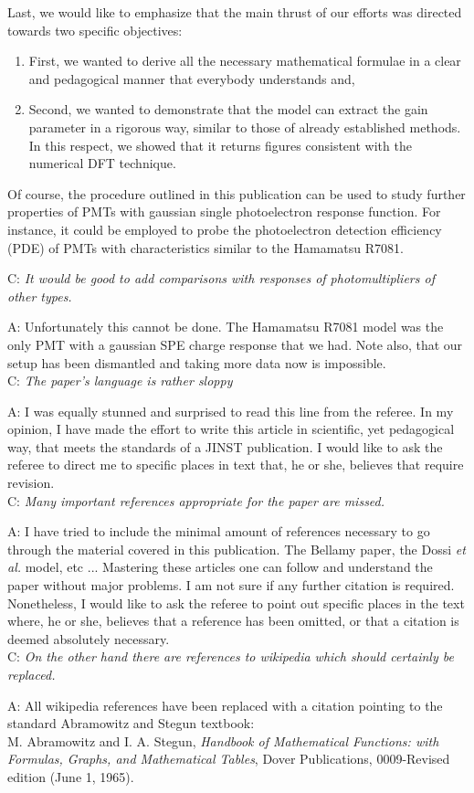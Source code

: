\documentclass[a4paper,11pt]{article}
\begin{document}
Last, we would like to emphasize that the main thrust of our efforts was directed towards two specific objectives:
\begin{enumerate}
\item First, we wanted to derive all the necessary mathematical formulae in a clear and pedagogical manner that everybody understands and,
\item Second, we wanted to demonstrate that the model can extract the gain parameter in a rigorous way, similar to those of already established methods. 
In this respect, we showed that it returns figures consistent with the numerical DFT technique.  
\end{enumerate}
Of course, the procedure outlined in this publication can be used to study further properties of PMTs with gaussian single photoelectron response function. 
For instance, it could be employed to probe the photoelectron detection efficiency (PDE) of PMTs with characteristics similar to the Hamamatsu R7081. 

C: \emph{It would be good to add comparisons with responses of photomultipliers of other types. }

A: Unfortunately this cannot be done. 
The Hamamatsu R7081 model was the only PMT with a gaussian SPE charge response that we had. 
Note also, that our setup has been dismantled and taking more data now is impossible.  
\\[1ex]

C: \emph{The paper's language is rather sloppy}

A: I was equally stunned and surprised to read this line from the referee. 
In my opinion, I have made the effort to write this article in scientific, yet pedagogical way, that meets the standards of a JINST publication. 
I would like to ask the referee to direct me to specific places in text that, he or she, believes that require revision. 
\\[1ex]

C: \emph{Many important references appropriate for the paper are missed.}

A: I have tried to include the minimal amount of references necessary to go through the material covered in this publication. 
The Bellamy paper, the Dossi \emph{et al.} model, etc ... Mastering these articles one can follow and understand the paper without major problems. 
I am not sure if any further citation is required. 
Nonetheless, I would like to ask the referee to point out specific places in the text where, he or she, believes that a reference has been omitted, or that a citation is deemed absolutely necessary.  
\\[1ex]

C: \emph{On the other hand there are references to wikipedia which should certainly be replaced. }

A: All wikipedia references have been replaced with a citation pointing to the standard Abramowitz and Stegun textbook:
\\[1ex]

M. Abramowitz and I. A. Stegun, \emph{Handbook of Mathematical Functions: with Formulas, Graphs, and Mathematical Tables}, Dover Publications, 0009-Revised edition (June 1, 1965).  
\end{document}

